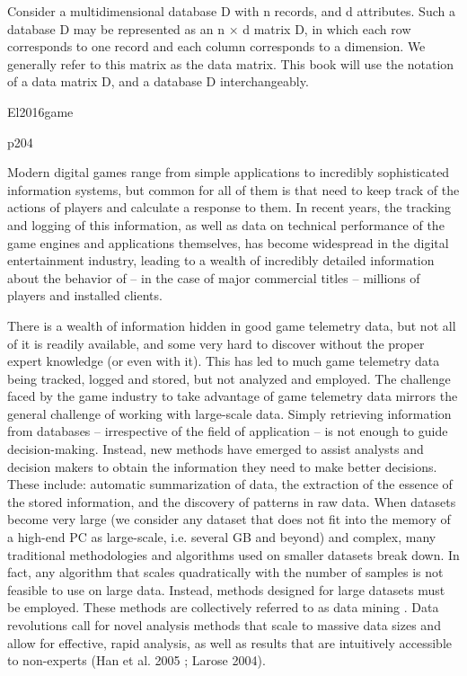 Consider a multidimensional database D with n records, and d attributes. Such a database D may be represented as an n × d matrix D, in which each row corresponds to one record and each column corresponds to a dimension. We generally refer to this matrix as the data matrix. This book will use the notation of a data matrix D, and a database D interchangeably.


El2016game

p204

Modern digital games range from simple applications to incredibly sophisticated information systems, but common for all of them is that need to keep track of the actions of players and calculate a response to them. In recent years, the tracking and logging of this information, as well as data on technical performance of the game engines and applications themselves, has become widespread in the digital entertainment industry, leading to a wealth of incredibly detailed information about the behavior of – in the case of major commercial titles – millions of players and installed clients.


There is a wealth of information hidden in good game telemetry data, but not all of it is readily available, and some very hard to discover without the proper expert knowledge (or even with it). This has led to much game telemetry data being tracked, logged and stored, but not analyzed and employed. The challenge faced by the game industry to take advantage of game telemetry data mirrors the general challenge of working with large-scale data. Simply retrieving information from databases – irrespective of the field of application – is not enough to guide decision-making. Instead, new methods have emerged to assist analysts and decision makers to obtain the information they need to make better decisions. These include: automatic summarization of data, the extraction of the essence of the stored information, and the discovery of patterns in raw data. When datasets become very large (we consider any dataset that does not fit into the memory of a high-end PC as large-scale, i.e. several
GB and beyond) and complex, many traditional methodologies and algorithms used on smaller datasets break down. In fact, any algorithm that scales quadratically with the number of samples is not feasible to use on large data. Instead, methods designed for large datasets must be employed. These methods are collectively referred to as data mining . Data revolutions call for novel analysis methods that scale to massive data sizes and allow for effective, rapid analysis, as well as results that are intuitively accessible to non-experts (Han et al. 2005 ; Larose 2004).

